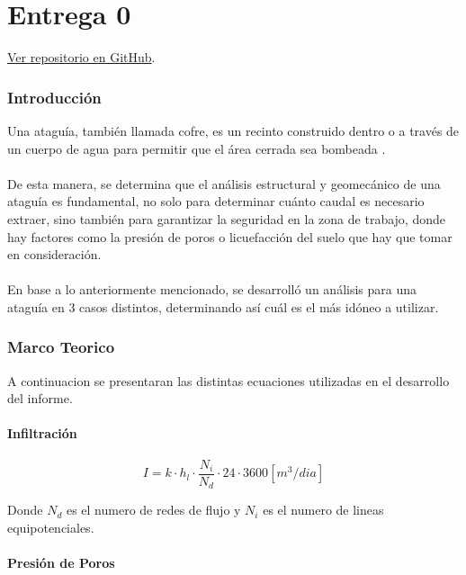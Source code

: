 \part{Entrega 0}
\begin{center}
  \href{https://github.com/LukasWolff2002/PROYECTO_1_MCOCo}{Ver repositorio en GitHub}.
\end{center}

\section{Introducción}

Una ataguía, también llamada cofre, es un recinto construido dentro o a través de un cuerpo de agua para permitir que el área cerrada sea bombeada \textbf{\citet{acerlum2023}}.
\\ \\
De esta manera, se determina que el análisis estructural y geomecánico de una ataguía es fundamental, no solo para determinar cuánto caudal es necesario extraer, sino también para garantizar la seguridad en la zona de trabajo, donde hay factores como la presión de poros o licuefacción del suelo que hay que tomar en consideración.
\\ \\
En base a lo anteriormente mencionado, se desarrolló un análisis para una ataguía en 3 casos distintos, determinando así cuál es el más idóneo a utilizar.

\section{Marco Teorico}

A continuacion se presentaran las distintas ecuaciones utilizadas en el desarrollo del informe.

\subsection{Infiltración}

\begin{equation}
  I = k \cdot h_l \cdot \frac{N_i}{N_d} \cdot 24 \cdot 3600 [m^3/dia]
\end{equation}

Donde $N_d$ es el numero de redes de flujo y $N_i$ es el numero de lineas equipotenciales.

\subsection{Presión de Poros}

